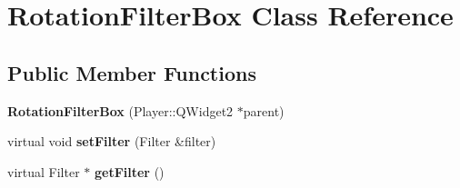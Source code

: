 \hypertarget{classRotationFilterBox}{}\section{Rotation\+Filter\+Box Class Reference}
\label{classRotationFilterBox}
\subsection*{Public Member Functions}
\begin{DoxyCompactItemize}
\item 
\hypertarget{classRotationFilterBox_a052cd75c13baacbc0de1722c50406e78}{}{\bfseries Rotation\+Filter\+Box} (Player\+::\+Q\+Widget2 $\ast$parent)\label{classRotationFilterBox_a052cd75c13baacbc0de1722c50406e78}

\item 
\hypertarget{classRotationFilterBox_a09e99b0db09b8468ce7d7e0f98293ac5}{}virtual void {\bfseries set\+Filter} (Filter \&filter)\label{classRotationFilterBox_a09e99b0db09b8468ce7d7e0f98293ac5}

\item 
\hypertarget{classRotationFilterBox_ad7b14770615490d1445c958c79fd3adb}{}virtual Filter $\ast$ {\bfseries get\+Filter} ()\label{classRotationFilterBox_ad7b14770615490d1445c958c79fd3adb}

\end{DoxyCompactItemize}
